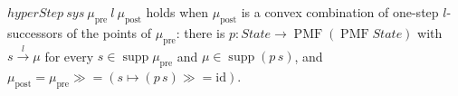 \begin{definition}
  \label{def:hyperstep}
  \leanok
  $hyperStep\ sys\ \mu_{\mathrm{pre}}\ l\ \mu_{\mathrm{post}}$ holds when $\mu_{\mathrm{post}}$ is a convex combination of one-step $l$-successors of the points of $\mu_{\mathrm{pre}}$: there is $p : State \to \operatorname{PMF}(\operatorname{PMF} State)$ with $s \xrightarrow{l} \mu$ for every $s \in \operatorname{supp}\mu_{\mathrm{pre}}$ and $\mu \in \operatorname{supp}(p\,s)$, and $\mu_{\mathrm{post}} = \mu_{\mathrm{pre}} \mathbin{\gg\!=} (s \mapsto (p\,s)\mathbin{\gg\!=}\mathrm{id})$.
\end{definition}
